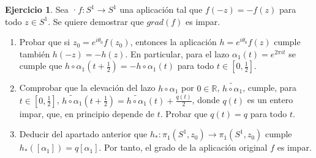 \documentclass{article}
\theoremstyle{plain}
\theoremstyle{definition}
\newtheorem{exercise}{Ejercicio}
\begin{document}
\newpage

\begin{exercise} \label{grado2} Sea ·$f: S^1\to S^1$ una aplicaci\'on tal que $f(-z) = -f(z)$ para todo $z\in S^1$. Se quiere demostrar que $grad(f)$ es impar.
\begin{enumerate}
\item Probar que si $z_0 = e^{i\theta_0}f(z_0)$, entonces la aplicaci\'on $h = e^{i\theta_0}f(z)$ cumple tambi\'en $h(-z) = -h(z)$. En particular, para el lazo $\alpha_1(t) = e^{2\pi i t}$  se cumple que $h\circ \alpha_1(t+\frac{1}{2}) = -h \circ \alpha_1(t)$ para todo $t\in [0,\frac{1}{2}]$.

\item Comprobar que la elevaci\'on del lazo $h\circ \alpha_1$ por $0\in \mathbb{R}$,
$\widetilde{h\circ \alpha_1}$, cumple, para $t\in [0,\frac{1}{2}]$, $\widetilde{h\circ \alpha_1}(t+\frac{1}{2}) = \widetilde{h\circ \alpha_1}(t) +\frac{q(t)}{2}$, donde $q(t)$ es un entero impar, que, en principio depende de $t$. Probar que $q(t) = q$ para todo $t$.
\item Deducir del apartado anterior que $h_*: \pi_1(S^1,z_0) \to \pi_1(S^1,z_0)$ cumple $h_* ([\alpha_1]) = q [\alpha_1]$. Por tanto, el grado de la aplicaci\'on original $f$ es impar.

\end{enumerate}
\end{exercise}

\newpage
\end{document}
